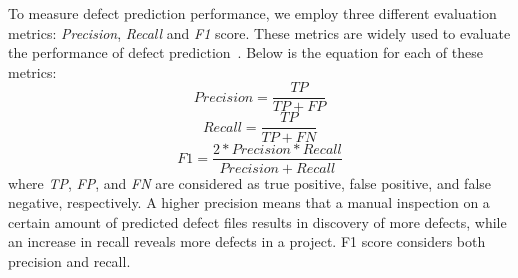 To measure defect prediction performance, we employ three different evaluation metrics: \textit{Precision}, \textit{Recall} and \textit{F1} score. These metrics are widely used to evaluate the performance of defect prediction~\cite{menzies2007data, menzies2010defect}. %
Below is the equation for each of these metrics:
\begin{equation}
\label{eq:precision}
Precision = \frac{TP}{TP+FP} 
\end{equation}
\begin{equation}
\label{eq:recall}
Recall = \frac{TP}{TP+FN}
\end{equation}
\begin{equation}
\label{eq:f1}
F1 = \frac{2 * Precision * Recall}{Precision + Recall}
\end{equation}
where \textit{TP}, \textit{FP}, and \textit{FN} are considered as true positive, false positive, and false negative, respectively.
A higher precision means that a manual inspection on a certain amount of predicted defect files results in discovery of more defects, while an increase in recall reveals more defects in a project. F1 score considers both precision and recall. 

